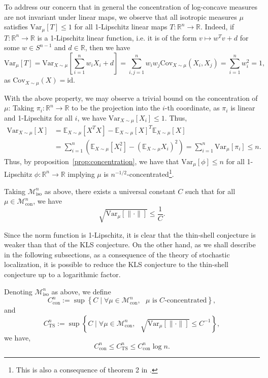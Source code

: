 To address our concern that in general the concentration of log-concave measures are not invariant under linear maps, 
we observe that all isotropic measures \(\mu\) satisfies \(\text{Var}_\mu[T] \le 1\) for all 1-Lipschitz linear maps 
\(T : \mathbb{R}^n \to \mathbb{R}\). Indeed, if 
\(T : \mathbb{R}^n \to \mathbb{R}\) is a 1-Lipschitz linear function, i.e. it is of the form \(v \mapsto w^T v + d\) 
for some \(w \in S^{n - 1}\) and \(d \in \mathbb{R}\), then we have
\[\text{Var}_{\mu}[T] = \text{Var}_{X \sim \mu}\left[\sum_{i = 1}^n w_i X_i + d\right] 
    = \sum_{i, j = 1}^n w_i w_j \text{Cov}_{X \sim \mu}(X_i, X_j) = \sum_{i = 1}^n w_i^2 = 1,\]
as \(\text{Cov}_{X \sim \mu}(X) = \text{id}\). 

With the above property, we may observe a trivial bound on the concentration of \(\mu\):
Taking \(\pi_i : \mathbb{R}^n \to \mathbb{R}\) to be the projection into the \(i\)-th coordinate, 
as \(\pi_i\) is linear and 1-Lipschitz for all \(i\), we have \(\text{Var}_{X \sim \mu}[X_i] \le 1\).
Thus, 
\begin{align*}
  \text{Var}_{X \sim \mu}[X] & = \mathbb{E}_{X \sim \mu}[X^T X] - \mathbb{E}_{X \sim \mu}[X]^T \mathbb{E}_{X \sim \mu}[X]\\ 
    & = \sum_{i = 1}^n (\mathbb{E}_{X \sim \mu}[X_i^2] - (\mathbb{E}_{X \sim \mu}X_i)^2)
      = \sum_{i = 1}^n \text{Var}_\mu[\pi_i] \le n.
\end{align*}
Thus, by proposition~\ref{prop:concentration}, we have that \(\text{Var}_\mu[\phi] \le n\) for all 
1-Lipschitz \(\phi : \mathbb{R}^n \to \mathbb{R}\) implying \(\mu\) is \(n^{-1/2}\)-concentrated\footnote{This is also a consequence of theorem 2 in \cite{Lee_2016}.}.

\begin{conjecture}
  Taking \(\mathscr{M}^n_{\text{iso}}\) as above, there exists a universal constant \(C\) such that 
  for all \(\mu \in \mathscr{M}^n_{\text{con}}\), we have
  \[\sqrt{\text{Var}_\mu[\|\cdot\|]} \le \frac{1}{C}.\]
\end{conjecture}

Since the norm function is 1-Lipschitz, it is clear that the thin-shell conjecture is 
weaker than that of the KLS conjecture. On the other hand, as we shall describe in the following subsections, 
as a consequence of the theory of stochastic localization, it is possible to reduce the KLS conjecture to 
the thin-shell conjecture up to a logarithmic factor. 

\begin{theorem}\label{thm:KLS_to_TS}
  Denoting \(\mathscr{M}^n_{\text{iso}}\) as above, we define 
  \[C^n_{\text{con}} := \sup \left\{C \mid \text{\(\forall \mu \in \mathscr{M}^n_{\text{con}},\) 
    \(\mu\) is \(C\)-concentrated}\right\},\]
  and 
  \[C^n_{\text{TS}} := \sup \left\{C \mid \text{\(\forall \mu \in \mathscr{M}^n_{\text{con}},\) 
      \(\sqrt{\text{Var}_\mu[\|\cdot\|]} \le C^{-1}\)}\right\},\]
  we have,
  \[C^n_{\text{con}} \le C^n_{\text{TS}} \le C^n_{\text{con}}\log n.\]
\end{theorem}

